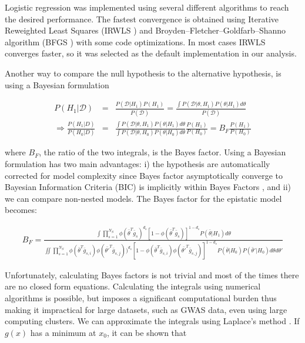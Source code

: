 Logistic regression was implemented using several different algorithms to reach the desired performance. The fastest convergence is obtained using Iterative Reweighted Least Squares (IRWLS \cite{daubechies2010iteratively}) and Broyden–Fletcher–Goldfarb–Shanno algorithm (BFGS \cite{broyden1970convergence}) with some code optimizations. In most cases IRWLS converges faster, so it was selected as the default implementation in our analysis.

Another way to compare the null hypothesis to the alternative hypothesis, is using a Bayesian formulation \cite{kass1995bayes, wakefield2009bayes}

\begin{eqnarray*}
	P(H_1 | \mathcal{D}) & = & \frac{ P( \mathcal{D} | H_1) P(H_1) }{ P(\mathcal{D}) } = \frac{ \int{ P(\mathcal{D} | \theta , H_1) P( \theta | H_1)  d\theta } }{ P(\mathcal{D}) }  \\
	\Rightarrow  \frac{ P(H_1 | D)  }{ P(H_0 | D)  } & = & \frac{ \int{ P(\mathcal{D} | \theta , H_1) P( \theta | H_1)  d\theta } }{\int{ P(\mathcal{D} | \theta , H_0 ) P( \theta | H_0)  d\theta } } \frac{ P(H_1) }{ P(H_0)  }  
	=  B_F \frac{ P(H_1) }{ P(H_0)  }
\end{eqnarray*}

where $B_F$, the ratio of the two integrals, is the Bayes factor. Using a Bayesian formulation has two main advantages: i) the hypothesis are automatically corrected for model complexity since Bayes factor asymptotically converge to Bayesian Information Criteria (BIC) is implicitly within Bayes Factors \cite{kass1995bayes}, and ii) we can compare non-nested models. The Bayes factor for the epistatic model becomes:

\begin{eqnarray}\label{eq:bf2}
	B_F = \frac
	{ \int{ \prod_{s=1}^{N_S}{ \phi( \bar{\theta}^T \bar{g}_s)^{d_s} [ 1-\phi( \bar{\theta}^T \bar{g}_s) ]^{1-d_s} } P( \bar{\theta} | H_1)  d\theta } }
	{ \iint{ \prod_{s=1}^{N_S}{ 
	\phi( \bar{\theta}^T \bar{g}_{s,i}) 
	\phi( \bar{\theta'}^T \bar{g}_{s,j} ) )^{d_s} 
	[ 1-\phi( \bar{\theta}^T \bar{g}_{s,i}) \phi( \bar{\theta'}^T \bar{g}_{s,j} ) ]^{1-d_s} } 
	P( \bar{\theta} | H_0) 
	P( \bar{\theta}' | H_0)  
	d\theta d\theta' } }
\end{eqnarray}

Unfortunately, calculating Bayes factors is not trivial and most of the times there are no closed form equations. Calculating the integrals using numerical algorithms is possible, but  imposes a significant computational burden thus making it impractical for large datasets, such as GWAS data, even using large computing clusters. We can approximate the integrals using Laplace's method  \cite{kass1995bayes}. If $g(x)$ has a minimum at $x_0$, it can be shown that

